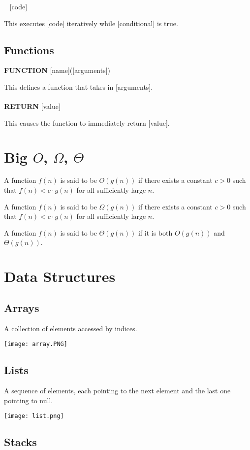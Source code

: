 \documentclass[10pt]{article}
\renewcommand{\bf}[1]{\textbf{#1}}
\newcommand{\header}[1]
{
\section*{#1}
}
\begin{document}
\begin{multicols}{3}
\noindent \,\,\, [code]

\noindent This executes [code] iteratively while [conditional] is true.

\subsection*{Functions}
\bf{FUNCTION} [name]([arguments])

This defines a function that takes in [arguments].\\
\\
\bf{RETURN} [value]

This causes the function to immediately return [value].

\header{Big $O$, $\Omega$, $\Theta$}

A function $f(n)$ is said to be $O(g(n))$ if there exists a constant $c>0$ such that $f(n)<c\cdot g(n)$ for all sufficiently large $n$.

A function $f(n)$ is said to be $\Omega(g(n))$ if there exists a constant $c>0$ such that $f(n)<c\cdot g(n)$ for all sufficiently large $n$.

A function $f(n)$ is said to be $\Theta(g(n))$ if it is both $O(g(n))$ and $\Theta(g(n))$.

\header{Data Structures}

\subsection*{Arrays}

A collection of elements accessed by indices.

\begin{center}
\texttt{[image: array.PNG]}
\end{center}

\vspace{-15pt}

\subsection*{Lists}

A sequence of elements, each pointing to the next element and the last one pointing to null.

\begin{center}
\texttt{[image: list.png]}
\end{center}

\vspace{-15pt}

\subsection*{Stacks}


\end{multicols}
\end{document}

